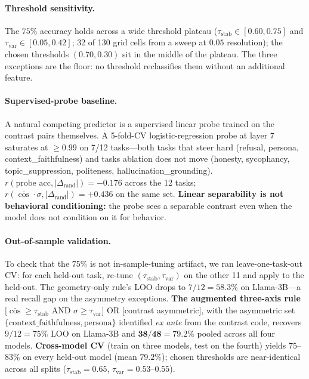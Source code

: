 \documentclass[11pt]{article}
\begin{document}
\paragraph{Threshold sensitivity.}
The $75\%$ accuracy holds across a wide threshold plateau
($\tau_{\text{stab}} \in [0.60, 0.75]$ and
$\tau_{\text{var}} \in [0.05, 0.42]$; 32 of 130 grid cells from a
sweep at $0.05$ resolution); the chosen thresholds $(0.70, 0.30)$
sit in the middle of the plateau. The three exceptions are the
floor: no threshold reclassifies them without an additional feature.

\paragraph{Supervised-probe baseline.}
A natural competing predictor is a supervised linear probe trained
on the contrast pairs themselves. A 5-fold-CV logistic-regression
probe at layer 7 saturates at $\geq 0.99$ on 7/12 tasks---both
tasks that steer hard (refusal, persona, context\_faithfulness)
and tasks ablation does not move (honesty, sycophancy,
topic\_suppression, politeness, hallucination\_grounding).
$r(\text{probe acc}, |\Delta_{\text{rand}}|) = -0.176$ across the
12 tasks; $r(\bar{\cos} \cdot \sigma, |\Delta_{\text{rand}}|) =
+0.436$ on the same set. \textbf{Linear separability is not
behavioral conditioning:} the probe sees a separable contrast even
when the model does not condition on it for behavior.

\paragraph{Out-of-sample validation.}
To check that the $75\%$ is not in-sample-tuning artifact, we ran
leave-one-task-out CV: for each held-out task, re-tune
$(\tau_{\text{stab}}, \tau_{\text{var}})$ on the other 11 and apply
to the held-out. The geometry-only rule's LOO drops to $7/12 \!=\!
58.3\%$ on Llama-3B---a real recall gap on the asymmetry
exceptions. \textbf{The augmented three-axis rule}
$\big[\bar{\cos} \!\geq\! \tau_{\text{stab}}$ AND
$\sigma \!\geq\! \tau_{\text{var}}\big]$ OR $\big[$contrast
asymmetric$\big]$, with the asymmetric set
$\{\text{context\_faithfulness}, \text{persona}\}$ identified
\emph{ex ante} from the contrast code, recovers $9/12 = 75\%$ LOO
on Llama-3B and $\mathbf{38/48 = 79.2\%}$ pooled across all four
models. \textbf{Cross-model CV} (train on three models, test on the
fourth) yields $75$--$83\%$ on every held-out model (mean $79.2\%$);
chosen thresholds are near-identical across all splits
($\tau_{\text{stab}} \!=\! 0.65$, $\tau_{\text{var}} \!=\!
0.53$--$0.55$).
\end{document}
